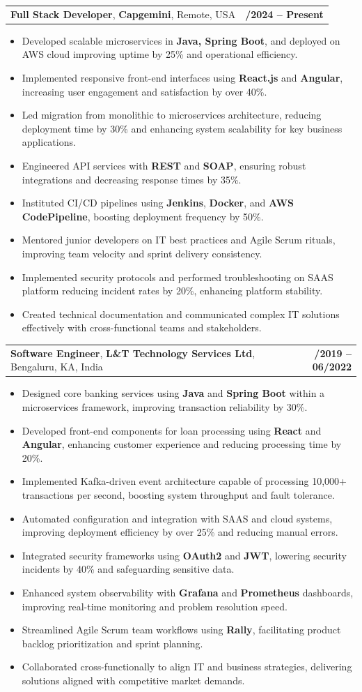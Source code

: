 \documentclass[letterpaper,11pt]{article}
\makeatletter
\newcommand{\resumeItem}[1]{
  \item\footnotesize{
    {#1 \vspace{-2pt}}
  }
}
\newcommand{\resumeSubheading}[4]{
  \vspace{-2pt}\item
    \begin{tabular*}{1.0\textwidth}[t]{l@{\extracolsep{\fill}}r}
      \textbf{\fontsize{10pt}{14pt}\selectfont #3}, \textbf{\fontsize{10pt}{14pt}\selectfont #1}, \fontsize{10pt}{14pt}\selectfont #4 & \textbf{\fontsize{10pt}{14pt}\selectfont #2} \\
    \end{tabular*}\vspace{-7pt}
}
\newcommand{\resumeItemListStart}{\begin{itemize}[leftmargin=*]}
\newcommand{\resumeItemListEnd}{\end{itemize}\vspace{-5pt}}
\makeatother
\begin{document}
    \resumeSubheading
        {Capgemini}{01/2024 -- Present}
        {Full Stack Developer}{Remote, USA}
      \resumeItemListStart
        \resumeItem{Developed scalable microservices in \textbf{Java, Spring Boot}, and deployed on AWS cloud improving uptime by 25\% and operational efficiency.}
        \resumeItem{Implemented responsive front-end interfaces using \textbf{React.js} and \textbf{Angular}, increasing user engagement and satisfaction by over 40\%.}
        \resumeItem{Led migration from monolithic to microservices architecture, reducing deployment time by 30\% and enhancing system scalability for key business applications.}
        \resumeItem{Engineered API services with \textbf{REST} and \textbf{SOAP}, ensuring robust integrations and decreasing response times by 35\%.}
        \resumeItem{Instituted CI/CD pipelines using \textbf{Jenkins}, \textbf{Docker}, and \textbf{AWS CodePipeline}, boosting deployment frequency by 50\%.}
        \resumeItem{Mentored junior developers on IT best practices and Agile Scrum rituals, improving team velocity and sprint delivery consistency.}
        \resumeItem{Implemented security protocols and performed troubleshooting on SAAS platform reducing incident rates by 20\%, enhancing platform stability.}
        \resumeItem{Created technical documentation and communicated complex IT solutions effectively with cross-functional teams and stakeholders.}
      \resumeItemListEnd

    \resumeSubheading
        {L\&T Technology Services Ltd}{08/2019 -- 06/2022}
        {Software Engineer}{Bengaluru, KA, India}
      \resumeItemListStart
        \resumeItem{Designed core banking services using \textbf{Java} and \textbf{Spring Boot} within a microservices framework, improving transaction reliability by 30\%.}
        \resumeItem{Developed front-end components for loan processing using \textbf{React} and \textbf{Angular}, enhancing customer experience and reducing processing time by 20\%.}
        \resumeItem{Implemented Kafka-driven event architecture capable of processing 10,000+ transactions per second, boosting system throughput and fault tolerance.}
        \resumeItem{Automated configuration and integration with SAAS and cloud systems, improving deployment efficiency by over 25\% and reducing manual errors.}
        \resumeItem{Integrated security frameworks using \textbf{OAuth2} and \textbf{JWT}, lowering security incidents by 40\% and safeguarding sensitive data.}
        \resumeItem{Enhanced system observability with \textbf{Grafana} and \textbf{Prometheus} dashboards, improving real-time monitoring and problem resolution speed.}
        \resumeItem{Streamlined Agile Scrum team workflows using \textbf{Rally}, facilitating product backlog prioritization and sprint planning.}
        \resumeItem{Collaborated cross-functionally to align IT and business strategies, delivering solutions aligned with competitive market demands.}
      \resumeItemListEnd
\end{document}
